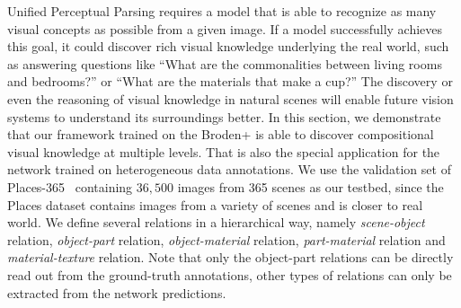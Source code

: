 \documentclass[runningheads]{llncs}
\begin{document}
Unified Perceptual Parsing requires a model that is able to recognize as many visual concepts as possible from a given image. If a model successfully achieves this goal, it could discover rich visual knowledge underlying the real world, such as answering questions like ``What are the commonalities between living rooms and bedrooms?'' or ``What are the materials that make a cup?'' The discovery or even the reasoning of visual knowledge in natural scenes will enable future vision systems to understand its surroundings better. In this section, we demonstrate that our framework trained on the Broden+ is able to discover compositional visual knowledge at multiple levels. That is also the special application for the network trained on heterogeneous data annotations. We use the validation set of Places-365~\cite{zhou2014learning} containing $36,500$ images from 365 scenes as our testbed, since the Places dataset contains images from a variety of scenes and is closer to real world. We define several relations in a hierarchical way, namely \emph{scene-object} relation, \emph{object-part} relation, \emph{object-material} relation, \emph{part-material} relation and \emph{material-texture} relation. Note that only the object-part relations can be directly read out from the ground-truth annotations, other types of relations can only be extracted from the network predictions. 
\end{document}

